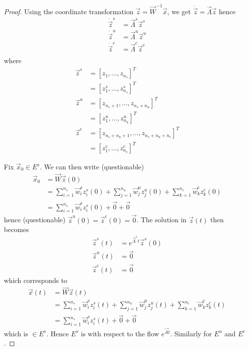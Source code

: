 \begin{proof}
	Using the coordinate transformation $\vec z = \vec W^{-1} \vec x$, we get $\dot{\vec z} = \vec \Lambda \vec z$ hence
	\begin{align*}
		\dot{\vec z}^s &= \vec \Lambda^s \vec z^s \\
		\dot{\vec z}^u &= \vec \Lambda^u \vec z^u \\
		\dot{\vec z}^c &= \vec \Lambda^c \vec z^c \\
	\end{align*}
	where
	\begin{align*}
		\vec z^s 	&= [z_1, \dotsc, z_{n_s}]^T \\
					&= [z_1^s, \dotsc, z_{n_s}^s]^T \\
		\vec z^u 	&= [z_{n_s + 1}, \dotsc, z_{n_s + n_u}]^T \\
					&= [z_1^u, \dotsc, z_{n_u}^u]^T \\
		\vec z^c 	&= [z_{n_s + n_u + 1}, \dotsc, z_{n_s + n_u + n_c}]^T \\
					&= [z_1^c, \dotsc, z_{n_c}^c]^T 
	\end{align*}

	Fix $\vec x_0 \in E^s$. We can then write (questionable)
	\begin{align*}
		\vec x_0 	&= \vec W \vec z(0) \\
					&= \sum_{i = 1}^{n_s} \vec w_i^s z_i^s(0) + \sum_{j = 1}^{n_u} \vec w_j^u z_j^u(0) + \sum_{k = 1}^{n_c} \vec w_k^c z_k^c(0) \\
					&= \sum_{i = 1}^{n_s} \vec w_i^s z_i^s(0) + \vec 0 + \vec 0
	\end{align*}
	hence (questionable) $\vec z^u(0) = \vec z^c(0) = \vec 0$. The solution in $\vec z(t)$ then becomes
	\begin{align*}
		\vec z^s(t) &= e^{\vec \Lambda^s t} \vec z^s(0) \\
		\vec z^u(t) &= \vec 0 \\
		\vec z^c(t) &= \vec 0
	\end{align*}
	which corresponds to
	\begin{align*}
		\vec x(t) 	&= \vec W \vec z(t) \\
					&= \sum_{i = 1}^{n_s} \vec w_i^s z_i^s(t) + \sum_{j = 1}^{n_u} \vec w_j^u z_j^u(t) + \sum_{k = 1}^{n_c} \vec w_k^c z_k^c(t) \\
					&= \sum_{i = 1}^{n_s} \vec w_i^s z_i^s(t) + \vec 0 + \vec 0
	\end{align*}
	which is $\in E^s$. Hence $E^s$ is with respect to the flow $e^{\vec At}$. Similarly for $E^u$ and $E^c$.
\end{proof}

